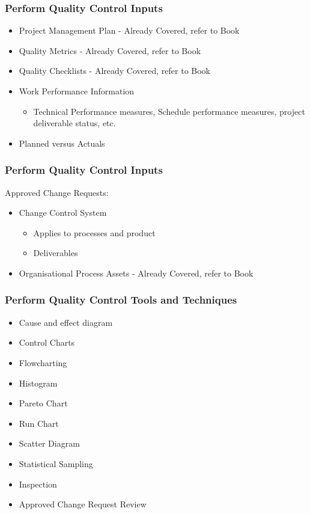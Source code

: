 \begin{frame}
\frametitle{Perform Quality Control \hfill Inputs}
\begin{itemize}
	\item Project Management Plan - Already Covered, refer to Book
	\item Quality Metrics - Already Covered, refer to Book
	\item Quality Checklists - Already Covered, refer to Book
	\item Work Performance Information
		\begin{itemize}
			\item Technical Performance measures, Schedule performance measures, project deliverable status, etc.
		\end{itemize}
	\item Planned versus Actuals
\end{itemize}
\end{frame}




\begin{frame}
\frametitle{Perform Quality Control \hfill Inputs}
Approved Change Requests:\\
\begin{itemize}
\item Change Control System
	\begin{itemize}
		\item Applies to processes and product
		\item Deliverables
	\end{itemize}
\item Organisational Process Assets - Already Covered, refer to Book
\end{itemize}
\end{frame}




\begin{frame}
\frametitle{Perform Quality Control \hfill Tools and Techniques}
\begin{itemize}
	\item Cause and effect diagram
	\item Control Charts
	\item Flowcharting
	\item Histogram
	\item Pareto Chart
	\item Run Chart
	\item Scatter Diagram
	\item Statistical Sampling
	\item Inspection
	\item Approved Change Request Review
\end{itemize}
\end{frame}





